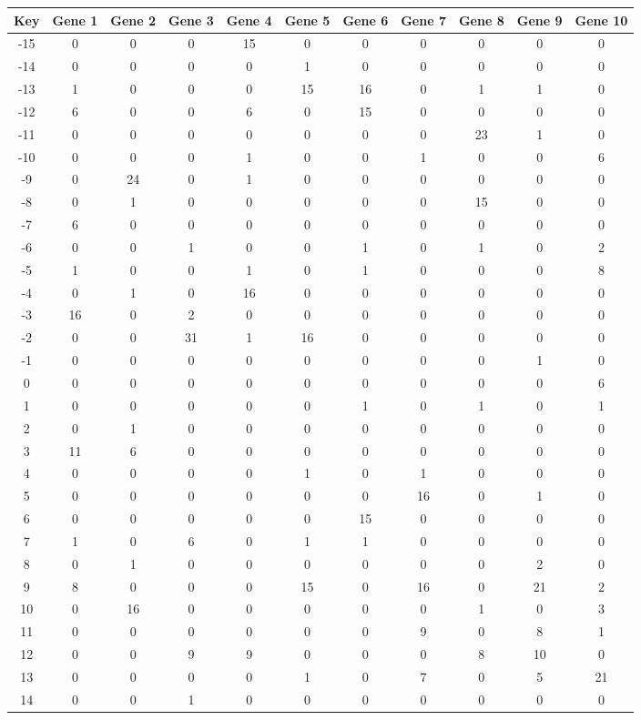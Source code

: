\begin{tabular}{|c|c|c|c|c|c|c|c|c|c|c|}
\hline
Key & Gene 1 & Gene 2 & Gene 3 & Gene 4 & Gene 5 & Gene 6 & Gene 7 & Gene 8 & Gene 9 & Gene 10 \\
\hline
-15 & 0 & 0 & 0 & 15 & 0 & 0 & 0 & 0 & 0 & 0 \\
-14 & 0 & 0 & 0 & 0 & 1 & 0 & 0 & 0 & 0 & 0 \\
-13 & 1 & 0 & 0 & 0 & 15 & 16 & 0 & 1 & 1 & 0 \\
-12 & 6 & 0 & 0 & 6 & 0 & 15 & 0 & 0 & 0 & 0 \\
-11 & 0 & 0 & 0 & 0 & 0 & 0 & 0 & 23 & 1 & 0 \\
-10 & 0 & 0 & 0 & 1 & 0 & 0 & 1 & 0 & 0 & 6 \\
-9 & 0 & 24 & 0 & 1 & 0 & 0 & 0 & 0 & 0 & 0 \\
-8 & 0 & 1 & 0 & 0 & 0 & 0 & 0 & 15 & 0 & 0 \\
-7 & 6 & 0 & 0 & 0 & 0 & 0 & 0 & 0 & 0 & 0 \\
-6 & 0 & 0 & 1 & 0 & 0 & 1 & 0 & 1 & 0 & 2 \\
-5 & 1 & 0 & 0 & 1 & 0 & 1 & 0 & 0 & 0 & 8 \\
-4 & 0 & 1 & 0 & 16 & 0 & 0 & 0 & 0 & 0 & 0 \\
-3 & 16 & 0 & 2 & 0 & 0 & 0 & 0 & 0 & 0 & 0 \\
-2 & 0 & 0 & 31 & 1 & 16 & 0 & 0 & 0 & 0 & 0 \\
-1 & 0 & 0 & 0 & 0 & 0 & 0 & 0 & 0 & 1 & 0 \\
0 & 0 & 0 & 0 & 0 & 0 & 0 & 0 & 0 & 0 & 6 \\
1 & 0 & 0 & 0 & 0 & 0 & 1 & 0 & 1 & 0 & 1 \\
2 & 0 & 1 & 0 & 0 & 0 & 0 & 0 & 0 & 0 & 0 \\
3 & 11 & 6 & 0 & 0 & 0 & 0 & 0 & 0 & 0 & 0 \\
4 & 0 & 0 & 0 & 0 & 1 & 0 & 1 & 0 & 0 & 0 \\
5 & 0 & 0 & 0 & 0 & 0 & 0 & 16 & 0 & 1 & 0 \\
6 & 0 & 0 & 0 & 0 & 0 & 15 & 0 & 0 & 0 & 0 \\
7 & 1 & 0 & 6 & 0 & 1 & 1 & 0 & 0 & 0 & 0 \\
8 & 0 & 1 & 0 & 0 & 0 & 0 & 0 & 0 & 2 & 0 \\
9 & 8 & 0 & 0 & 0 & 15 & 0 & 16 & 0 & 21 & 2 \\
10 & 0 & 16 & 0 & 0 & 0 & 0 & 0 & 1 & 0 & 3 \\
11 & 0 & 0 & 0 & 0 & 0 & 0 & 9 & 0 & 8 & 1 \\
12 & 0 & 0 & 9 & 9 & 0 & 0 & 0 & 8 & 10 & 0 \\
13 & 0 & 0 & 0 & 0 & 1 & 0 & 7 & 0 & 5 & 21 \\
14 & 0 & 0 & 1 & 0 & 0 & 0 & 0 & 0 & 0 & 0 \\
\hline
\end{tabular}